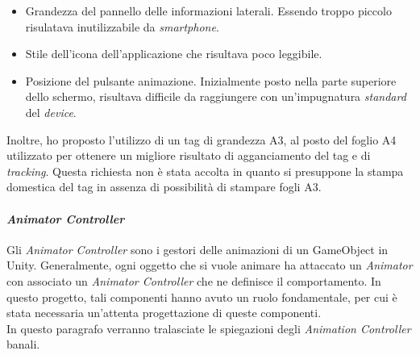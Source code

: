 \begin{itemize}
	\item Grandezza del pannello delle informazioni laterali. Essendo troppo piccolo risulatava inutilizzabile da \textit{smartphone}.
	\item Stile dell'icona dell'applicazione che risultava poco leggibile.
	\item Posizione del pulsante animazione. Inizialmente posto nella parte superiore dello schermo, risultava difficile da raggiungere con un'impugnatura \textit{standard} del \textit{device}.
\end{itemize}

Inoltre, ho proposto l'utilizzo di un tag di grandezza A3, al posto del foglio A4 utilizzato per ottenere un migliore risultato di agganciamento del tag e di \textit{tracking}. Questa richiesta non \`e stata accolta in quanto si presuppone la stampa domestica del tag in assenza di possibilit\`a di stampare fogli A3.\\


\paragraph{\textit{Animator Controller}}
Gli \textit{Animator Controller} sono i gestori delle animazioni di un GameObject in Unity. Generalmente, ogni oggetto che si vuole animare ha attaccato un \textit{Animator} con associato un \textit{Animator Controller} che ne definisce il comportamento. In questo progetto, tali componenti hanno avuto un ruolo fondamentale, per cui \`e stata necessaria un'attenta progettazione di queste componenti.\\
In questo paragrafo verranno tralasciate le spiegazioni degli \textit{Animation Controller} banali.\\

